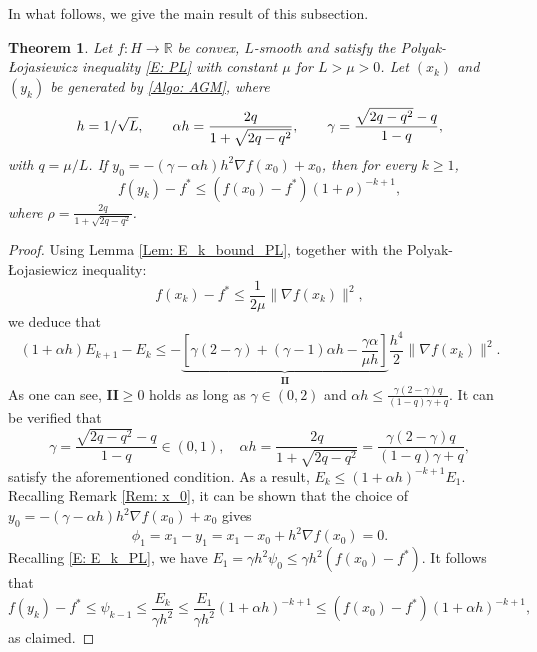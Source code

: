 \documentclass[pdflatex,sn-mathphys-num]{sn-jnl}
\theoremstyle{thmstyleone}
\newtheorem{theorem}{Theorem}
\theoremstyle{thmstyletwo}
\theoremstyle{thmstylethree}
\newcommand{\qbox}[1]{\quad\hbox{#1}\quad}
\newcommand{\R}{\mathbb{R}}
\begin{document}
In what follows, we give the main result of this subsection.


\begin{theorem}\label{Thm: algo_PL_OGM}
Let $f:H\to\R$ be convex, $L$-smooth and satisfy the Polyak-\L ojasiewicz inequality \eqref{E: PL} with constant $\mu$ for $L>\mu>0$. Let $(x_k)$ and $(y_k)$ be generated by \eqref{Algo: AGM}, where
$$ h=1/\sqrt{L},\qbox{}\alpha h = \frac{2q}{1+\sqrt{2q-q^2}},\qbox{}\gamma = \frac{\sqrt{2q-q^2}-q}{1-q}, $$
with $q=\mu/L$. If $y_0 = -(\gamma-\alpha h)h^2\nabla f(x_0)+x_0$, then for every $k\ge 1$,
$$ f(y_k) - f^* \le \left( f(x_0) - f^* \right) (1 + \rho)^{-k+1}, $$
where $\rho = \frac{2q}{1+\sqrt{2q-q^2}}$. 
\end{theorem}


\begin{proof}
Using Lemma \ref{Lem: E_k_bound_PL}, together with the Polyak-\L ojasiewicz inequality:
$$ f(x_k) - f^* \le \frac{1}{2\mu}\| \nabla f(x_k) \|^2, $$
we deduce that 
$$ (1+\alpha h)E_{k+1}-E_k 
\le - \underbrace{\left[ \gamma(2-\gamma) + (\gamma-1) \alpha h - \frac{\gamma \alpha}{\mu h} \right] }_{\mathbf{II}} \frac{h^4}{2} \| \nabla f(x_k) \|^2. $$
As one can see, $\mathbf{II}\ge 0$ holds as long as $\gamma\in(0,2)$ and $\alpha h \le \frac{\gamma(2-\gamma)q}{(1-q)\gamma+q}$. It can be verified that
\begin{equation}\nonumber
\gamma = \frac{\sqrt{2q-q^2}-q}{1-q}\in(0,1),\quad
\alpha h = \frac{2q}{1+\sqrt{2q-q^2}} = \frac{\gamma(2-\gamma)q}{(1-q)\gamma+q},
\end{equation}
satisfy the aforementioned condition. As a result, $E_k \le (1+\alpha h)^{-k+1}E_1$. Recalling Remark \ref{Rem: x_0}, it can be shown that the choice of $y_0 = -(\gamma-\alpha h)h^2\nabla f(x_0)+x_0$ gives
$$ \phi_1 = x_1 - y_1 = x_1-x_0+h^2\nabla f(x_0) = 0. $$
Recalling \eqref{E: E_k_PL}, we have $E_1 = \gamma h^2 \psi_0 \le \gamma h^2 \left( f(x_0) - f^* \right)$. It follows that
$$ f(y_k) - f^* \le \psi_{k-1} \le \frac{E_k}{\gamma h^2} \le \frac{E_1}{\gamma h^2}(1+\alpha h)^{-k+1} \le \left( f(x_0) - f^* \right)(1+\alpha h)^{-k+1}, $$
as claimed.
\end{proof}
\end{document}
